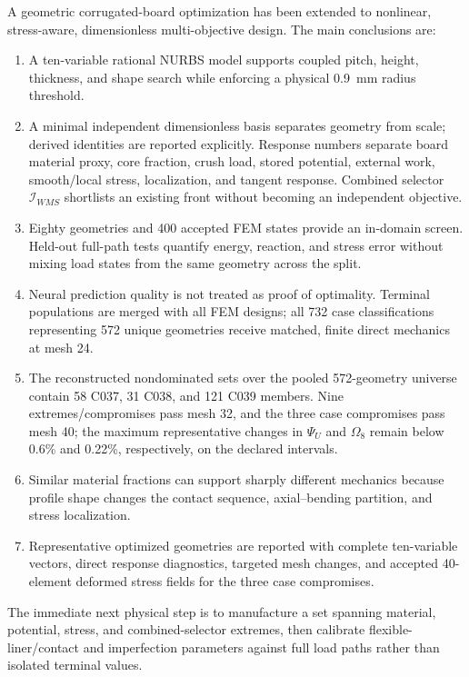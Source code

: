 \documentclass[11pt]{article}
\newcommand{\PsiU}{\Psi_{U}}
\newcommand{\Om}{\Omega_{8}}
\newcommand{\Iws}{\mathcal I_{WMS}}
\begin{document}
A geometric corrugated-board optimization has been extended to nonlinear, stress-aware, dimensionless multi-objective design. The main conclusions are:
\begin{enumerate}[leftmargin=*,itemsep=3pt]
\item A ten-variable rational NURBS model supports coupled pitch, height, thickness, and shape search while enforcing a physical 0.9~mm radius threshold.
\item A minimal independent dimensionless basis separates geometry from scale; derived identities are reported explicitly. Response numbers separate board material proxy, core fraction, crush load, stored potential, external work, smooth/local stress, localization, and tangent response. Combined selector $\Iws$ shortlists an existing front without becoming an independent objective.
\item Eighty geometries and 400 accepted FEM states provide an in-domain screen. Held-out full-path tests quantify energy, reaction, and stress error without mixing load states from the same geometry across the split.
\item Neural prediction quality is not treated as proof of optimality. Terminal populations are merged with all FEM designs; all 732 case classifications representing 572 unique geometries receive matched, finite direct mechanics at mesh 24.
\item The reconstructed nondominated sets over the pooled 572-geometry universe contain 58 C037, 31 C038, and 121 C039 members. Nine extremes/compromises pass mesh 32, and the three case compromises pass mesh 40; the maximum representative changes in $\PsiU$ and $\Om$ remain below 0.6\% and 0.22\%, respectively, on the declared intervals.
\item Similar material fractions can support sharply different mechanics because profile shape changes the contact sequence, axial--bending partition, and stress localization.
\item Representative optimized geometries are reported with complete ten-variable vectors, direct response diagnostics, targeted mesh changes, and accepted 40-element deformed stress fields for the three case compromises.
\end{enumerate}

The immediate next physical step is to manufacture a set spanning material, potential, stress, and combined-selector extremes, then calibrate flexible-liner/contact and imperfection parameters against full load paths rather than isolated terminal values.
\end{document}
